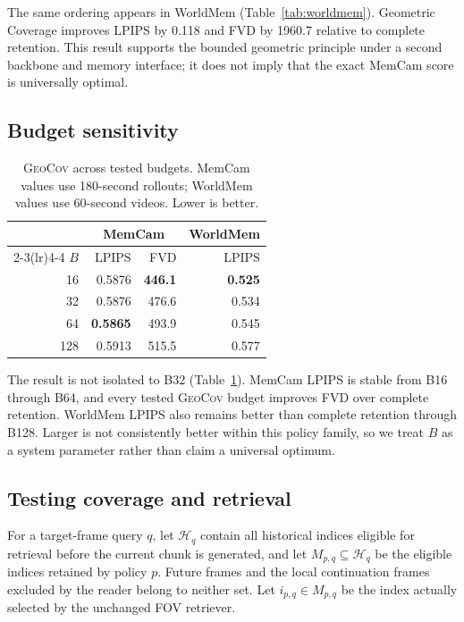 \documentclass[10pt,twocolumn]{article}
\newcommand{\Geo}{\textsc{GeoCov}\xspace}
\begin{document}
The same ordering appears in WorldMem (Table~\ref{tab:worldmem}). Geometric
Coverage improves LPIPS by 0.118 and FVD by 1960.7 relative to complete
retention. This result supports the bounded geometric principle under a second
backbone and memory interface; it does not imply that the exact MemCam score is
universally optimal.

\subsection{Budget sensitivity}

\begin{table}[!htbp]
\centering
\caption{\Geo across tested budgets. MemCam values use 180-second rollouts;
WorldMem values use 60-second videos. Lower is better.}
\label{tab:geo-budget}
\small
\begin{tabular}{rrrr}
\toprule
& \multicolumn{2}{c}{MemCam} & WorldMem \\
\cmidrule(lr){2-3}\cmidrule(lr){4-4}
$B$ & LPIPS & FVD & LPIPS \\
\midrule
16  & 0.5876 & \textbf{446.1} & \textbf{0.525} \\
32  & 0.5876 & 476.6 & 0.534 \\
64  & \textbf{0.5865} & 493.9 & 0.545 \\
128 & 0.5913 & 515.5 & 0.577 \\
\bottomrule
\end{tabular}
\end{table}

The result is not isolated to B32 (Table~\ref{tab:geo-budget}). MemCam LPIPS
is stable from B16 through B64, and every tested \Geo budget improves FVD over
complete retention. WorldMem LPIPS also remains better than complete retention
through B128. Larger is not consistently better within this policy family, so
we treat $B$ as a system parameter rather than claim a universal optimum.

\subsection{Testing coverage and retrieval}
\label{sec:gaps}

For a target-frame query $q$, let $\mathcal{H}_q$ contain all historical
indices eligible for retrieval before the current chunk is generated, and
let $M_{p,q}\subseteq\mathcal{H}_q$ be the eligible indices retained by
policy $p$. Future frames and the local continuation frames excluded by the
reader belong to neither set. Let $i_{p,q}\in M_{p,q}$ be the index actually
selected by the unchanged FOV retriever.
\end{document}
